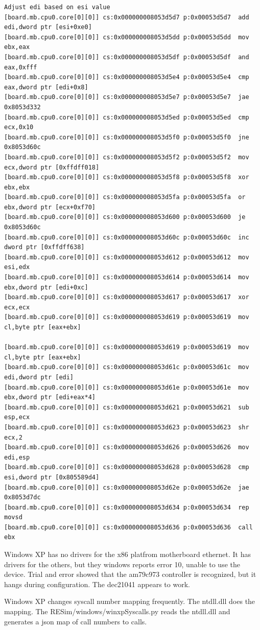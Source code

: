\documentclass[titlepage]{article}
\begin{document}
\begin{appendices}
\begin{verbatim}
Adjust edi based on esi value
[board.mb.cpu0.core[0][0]] cs:0x000000008053d5d7 p:0x00053d5d7  add edi,dword ptr [esi+0xe0]
[board.mb.cpu0.core[0][0]] cs:0x000000008053d5dd p:0x00053d5dd  mov ebx,eax
[board.mb.cpu0.core[0][0]] cs:0x000000008053d5df p:0x00053d5df  and eax,0xfff
[board.mb.cpu0.core[0][0]] cs:0x000000008053d5e4 p:0x00053d5e4  cmp eax,dword ptr [edi+0x8]
[board.mb.cpu0.core[0][0]] cs:0x000000008053d5e7 p:0x00053d5e7  jae 0x8053d332
[board.mb.cpu0.core[0][0]] cs:0x000000008053d5ed p:0x00053d5ed  cmp ecx,0x10
[board.mb.cpu0.core[0][0]] cs:0x000000008053d5f0 p:0x00053d5f0  jne 0x8053d60c
[board.mb.cpu0.core[0][0]] cs:0x000000008053d5f2 p:0x00053d5f2  mov ecx,dword ptr [0xffdff018]
[board.mb.cpu0.core[0][0]] cs:0x000000008053d5f8 p:0x00053d5f8  xor ebx,ebx
[board.mb.cpu0.core[0][0]] cs:0x000000008053d5fa p:0x00053d5fa  or ebx,dword ptr [ecx+0xf70]
[board.mb.cpu0.core[0][0]] cs:0x000000008053d600 p:0x00053d600  je 0x8053d60c
[board.mb.cpu0.core[0][0]] cs:0x000000008053d60c p:0x00053d60c  inc dword ptr [0xffdff638]
[board.mb.cpu0.core[0][0]] cs:0x000000008053d612 p:0x00053d612  mov esi,edx
[board.mb.cpu0.core[0][0]] cs:0x000000008053d614 p:0x00053d614  mov ebx,dword ptr [edi+0xc]
[board.mb.cpu0.core[0][0]] cs:0x000000008053d617 p:0x00053d617  xor ecx,ecx
[board.mb.cpu0.core[0][0]] cs:0x000000008053d619 p:0x00053d619  mov cl,byte ptr [eax+ebx]

[board.mb.cpu0.core[0][0]] cs:0x000000008053d619 p:0x00053d619  mov cl,byte ptr [eax+ebx]
[board.mb.cpu0.core[0][0]] cs:0x000000008053d61c p:0x00053d61c  mov edi,dword ptr [edi]
[board.mb.cpu0.core[0][0]] cs:0x000000008053d61e p:0x00053d61e  mov ebx,dword ptr [edi+eax*4]
[board.mb.cpu0.core[0][0]] cs:0x000000008053d621 p:0x00053d621  sub esp,ecx
[board.mb.cpu0.core[0][0]] cs:0x000000008053d623 p:0x00053d623  shr ecx,2
[board.mb.cpu0.core[0][0]] cs:0x000000008053d626 p:0x00053d626  mov edi,esp
[board.mb.cpu0.core[0][0]] cs:0x000000008053d628 p:0x00053d628  cmp esi,dword ptr [0x805589d4]
[board.mb.cpu0.core[0][0]] cs:0x000000008053d62e p:0x00053d62e  jae 0x8053d7dc
[board.mb.cpu0.core[0][0]] cs:0x000000008053d634 p:0x00053d634  rep movsd 
[board.mb.cpu0.core[0][0]] cs:0x000000008053d636 p:0x00053d636  call ebx

\end{verbatim}

Windows XP has no drivers for the x86 platfrom motherboard ethernet.  It has drivers
for the others, but they windows reports error 10, unable to use the device.
Trial and error showed that the am79c973 controller is recognized, but it hangs during configuration.
The dec21041 appears to work.

Windows XP changes syscall number mapping frequently.  The ntdll.dll does the mapping.  The 
RESim/windows/winxpSyscalls.py reads the ntdll.dll and generates a json map of call numbers to calls.

\end{appendices}
\end{document}
